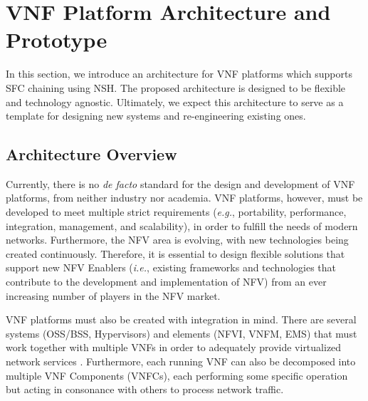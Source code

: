 \section{VNF Platform Architecture and Prototype} \label{ARCH}

In this section, we introduce an architecture for VNF platforms which supports SFC chaining using NSH. The proposed architecture is designed to be flexible and technology agnostic. Ultimately, we expect this architecture to serve as a template for designing new systems and re-engineering existing ones.

\subsection{Architecture Overview}

Currently, there is no \textit{de facto} standard for the design and development of VNF platforms, from neither industry nor academia. VNF platforms, however, must be developed to meet multiple strict requirements (\textit{e.g.}, portability, performance, integration, management, and scalability), in order to fulfill the needs of modern networks. Furthermore, the NFV area is evolving, with new technologies being created continuously. Therefore, it is essential to design flexible solutions that support new NFV Enablers (\textit{i.e.}, existing frameworks and technologies that contribute to the development and implementation of NFV) from an ever increasing number of players in the NFV market.

VNF platforms must also be created with integration in mind. There are several systems (OSS/BSS, Hypervisors) and elements (NFVI, VNFM, EMS) that must work together with multiple VNFs in order to adequately provide virtualized network services \cite{GS-2014}. Furthermore, each running VNF can also be decomposed into multiple VNF Components (VNFCs), each performing some specific operation but acting in consonance with others to process network traffic.


